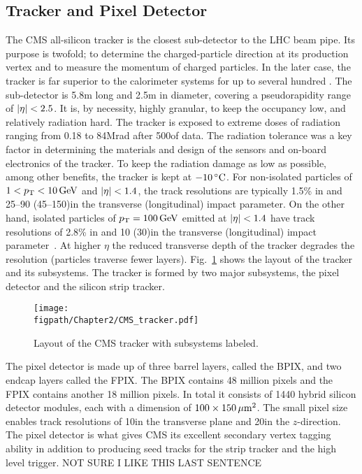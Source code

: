 \subsection{Tracker and Pixel Detector}
\label{sec:tracker_and_pixel}

The CMS all-silicon tracker is the closest sub-detector to the LHC beam pipe.
Its purpose is twofold; to determine the charged-particle direction at its production vertex and to measure the momentum of charged particles.
In the later case, the tracker is far superior to the calorimeter systems for \pt up to several hundred \gev.
The sub-detector is 5.8\unit{m} long and 2.5\unit{m} in diameter, covering a pseudorapidity range of $\lvert \eta \rvert<2.5$.
It is, by necessity, highly granular, to keep the occupancy low, and relatively radiation hard.
The tracker is exposed to extreme doses of radiation ranging from 0.18 to 84\unit{Mrad} after 500\fbinv of data.
The radiation tolerance was a key factor in determining the materials and design of the sensors and on-board electronics of the tracker.
To keep the radiation damage as low as possible, among other benefits, the tracker is kept at $-10\,^\circ\text{C}$.
For non-isolated particles of $1<p_{\mathrm{T}}<10\,\text{Ge\hspace{-.08em}V}$ and $\lvert \eta \rvert<1.4$, the track resolutions are typically 1.5\% in \pt and 25--90 (45--150)\mum in the transverse (longitudinal) impact parameter.
On the other hand, isolated particles of $p_{\mathrm{T}}=100\,\text{Ge\hspace{-.08em}V}$ emitted at $\lvert \eta \rvert<1.4$ have track resolutions of 2.8\% in \pt and 10 (30)\mum in the transverse (longitudinal) impact parameter~\cite{TRK-11-001}.
At higher $\eta$ the reduced transverse depth of the tracker degrades the resolution (particles traverse fewer layers).
Fig.~\ref{fig:CMS_tracker} shows the layout of the tracker and its subsystems. The tracker is formed by two major subsystems, the pixel detector and the silicon strip tracker.


\begin{figure}[!hbt]
	\centering
	\texttt{[image: \\figpath/Chapter2/CMS\_tracker.pdf]}
	\caption{Layout of the CMS tracker with subsystems labeled.}
	\label{fig:CMS_tracker}
\end{figure}

The pixel detector is made up of three barrel layers, called the BPIX, and two endcap layers called the FPIX.
The BPIX contains 48 million pixels and the FPIX contains another 18 million pixels.
In total it consists of 1440 hybrid silicon detector modules, each with a dimension of $100\times150\,\mu\text{m}^{2}$.
The small pixel size enables track resolutions of 10\mum in the transverse plane and 20\mum in the $z$-direction.
The pixel detector is what gives CMS its excellent secondary vertex tagging ability in addition to producing seed tracks for the strip tracker and the high level trigger.
NOT SURE I LIKE THIS LAST SENTENCE

